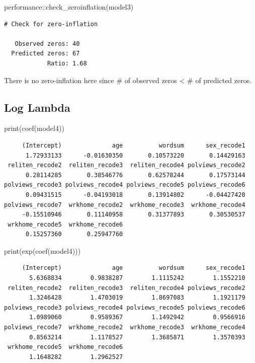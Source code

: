 \documentclass[
  letterpaper,
  DIV=11,
  numbers=noendperiod]{scrartcl}
\newenvironment{Shaded}{\begin{snugshade}}{\end{snugshade}}
\newcommand{\FunctionTok}[1]{\textcolor[rgb]{0.28,0.35,0.67}{#1}}
\newcommand{\NormalTok}[1]{\textcolor[rgb]{0.00,0.23,0.31}{#1}}
\newcommand{\SpecialCharTok}[1]{\textcolor[rgb]{0.37,0.37,0.37}{#1}}
\begin{document}
\begin{Shaded}
\begin{Highlighting}[]
\NormalTok{performance}\SpecialCharTok{::}\FunctionTok{check\_zeroinflation}\NormalTok{(model3)}
\end{Highlighting}
\end{Shaded}

\begin{verbatim}
# Check for zero-inflation

   Observed zeros: 40
  Predicted zeros: 67
            Ratio: 1.68
\end{verbatim}

There is no zero-inflation here since \# of observed zeros \textless{}
\# of predicted zeros.

\subsection{Log Lambda}

\begin{Shaded}
\begin{Highlighting}[]
\FunctionTok{print}\NormalTok{(}\FunctionTok{coef}\NormalTok{(model4))}
\end{Highlighting}
\end{Shaded}

\begin{verbatim}
     (Intercept)              age          wordsum      sex_recode1 
      1.72933133      -0.01630350       0.10573220       0.14429163 
 reliten_recode2  reliten_recode3  reliten_recode4 polviews_recode2 
      0.28114285       0.38546776       0.62578244       0.17573144 
polviews_recode3 polviews_recode4 polviews_recode5 polviews_recode6 
      0.09431515      -0.04193018       0.13914802      -0.04427420 
polviews_recode7  wrkhome_recode2  wrkhome_recode3  wrkhome_recode4 
     -0.15510946       0.11140958       0.31377893       0.30530537 
 wrkhome_recode5  wrkhome_recode6 
      0.15257360       0.25947760 
\end{verbatim}

\begin{Shaded}
\begin{Highlighting}[]
\FunctionTok{print}\NormalTok{(}\FunctionTok{exp}\NormalTok{(}\FunctionTok{coef}\NormalTok{(model4)))}
\end{Highlighting}
\end{Shaded}

\begin{verbatim}
     (Intercept)              age          wordsum      sex_recode1 
       5.6368834        0.9838287        1.1115242        1.1552210 
 reliten_recode2  reliten_recode3  reliten_recode4 polviews_recode2 
       1.3246428        1.4703019        1.8697083        1.1921179 
polviews_recode3 polviews_recode4 polviews_recode5 polviews_recode6 
       1.0989060        0.9589367        1.1492942        0.9566916 
polviews_recode7  wrkhome_recode2  wrkhome_recode3  wrkhome_recode4 
       0.8563214        1.1178527        1.3685871        1.3570393 
 wrkhome_recode5  wrkhome_recode6 
       1.1648282        1.2962527 
\end{verbatim}
\end{document}
